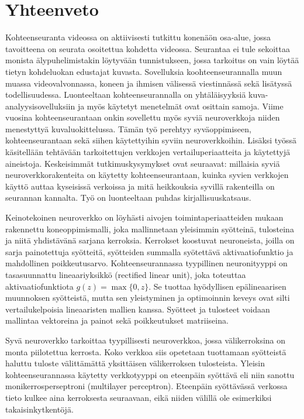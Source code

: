 \clearpage
\section*{Yhteenveto}
Kohteenseuranta videossa on aktiivisesti tutkittu konenäön osa-alue, jossa tavoitteena
on seurata osoitettua kohdetta videossa. Seurantaa ei tule sekoittaa monista älypuhelimistakin
löytyvään tunnistukseen, jossa tarkoitus on vain löytää tietyn kohdeluokan edustajat
kuvasta. Sovelluksia koohteenseurannalla muun muassa videovalvonnassa, koneen ja ihmisen
välisessä viestinnässä sekä lisätyssä todellisuudessa. Luonteeltaan kohteenseurannalla on
yhtäläisyyksiä kuva-analyysisovelluksiin ja myös käytetyt menetelmät ovat osittain samoja.
Viime vuosina kohteenseurantaan onkin sovellettu myös syviä neuroverkkoja niiden menestyttyä
kuvaluokittelussa. Tämän työ perehtyy syväoppimiseen, kohteenseurantaan sekä siihen
käytettyihin syviin neuroverkkoihin. Lisäksi työssä käsitellään tehtävään tarkoitettujen
verkkojen vertailuperiaatteita ja käytettyjä aineistoja. Keskeisimmät tutkimuskysymykset
ovat seuraavat: millaisia syviä neuroverkkorakenteita on käytetty kohteenseurantaan, kuinka
syvien verkkojen käyttö auttaa kyseisissä verkoissa ja mitä heikkouksia syvillä rakenteilla
on seurannan kannalta. Työ on luonteeltaan puhdas kirjallisuuskatsaus.

Keinotekoinen neuroverkko on löyhästi aivojen toimintaperiaatteiden mukaan rakennettu
koneoppimismalli, joka mallinnetaan yleisimmin syötteinä, tulosteina ja niitä yhdistävänä
sarjana kerroksia. Kerrokset koostuvat neuroneista, joilla on sarja painotettuja syötteitä,
syötteiden summalla syötettävä aktivaatiofunktio ja mahdollinen poikkeutusarvo. Kohteenseurannassa
tyypillinen neuronityyppi on tasasuunnattu lineaariyksikkö (rectified linear unit), joka
toteuttaa aktivaatiofunktiota $g (z) = \max\{0,z\}$. Se tuottaa hyödyllisen epälineaarisen
muunnoksen syötteistä, mutta sen yleistyminen ja optimoinnin keveys ovat silti vertailukelpoisia
lineaaristen mallien kanssa. Syötteet ja tulosteet voidaan mallintaa vektoreina ja painot sekä
poikkeutukset matriiseina.

Syvä neuroverkko tarkoittaa tyypillisesti neuroverkkoa, jossa välikerroksina on monta
piilotettua kerrosta. Koko verkkoa siis opetetaan tuottamaan syötteistä haluttu tuloste
välittämättä yksittäisen välikerroksen tulosteista. Yleisin kohteenseurannassa käytetty
verkkotyyppi on eteenpäin syöttävä eli niin sanottu monikerrosperseptroni (multilayer
perceptron). Eteenpäin syöttävässä verkossa tieto kulkee aina kerroksesta seuraavaan,
eikä niiden välillä ole esimerkiksi takaisinkytkentöjä.

